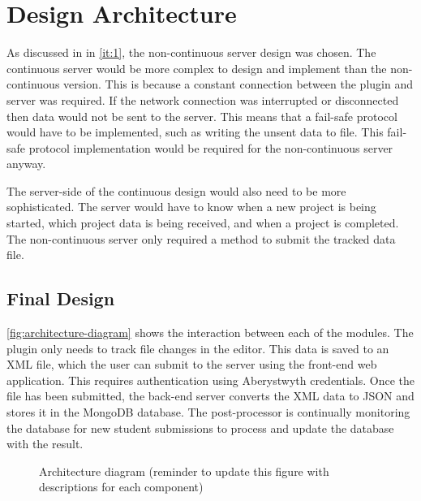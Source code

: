\chapter{Design Architecture}
\label{chp:design}
As discussed in  in \autoref{it:1}, the non-continuous server design was chosen. The continuous server would be more complex to design and implement than the non-continuous version. This is because a constant connection between the plugin and server was required. If the network connection was interrupted or disconnected then data would not be sent to the server. This means that a fail-safe protocol would have to be implemented, such as writing the unsent data to file. This fail-safe protocol implementation would be required for the non-continuous server anyway.

The server-side of the continuous design would also need to be more sophisticated. The server would have to know when a new project is being started, which project data is being received, and when a project is completed. The non-continuous server only required a method to submit the tracked data file.

\section{Final Design}
\autoref{fig:architecture-diagram} shows the interaction between each of the modules. The plugin only needs to track file changes in the editor. This data is saved to an XML file, which the user can submit to the server using the front-end web application. This requires authentication using Aberystwyth credentials. Once the file has been submitted, the back-end server converts the XML data to JSON and stores it in the MongoDB database. The post-processor is continually monitoring the database for new student submissions to process and update the database with the result.

\begin{figure}[H]
  \centering
  \caption[Final design architecture diagram]{Architecture diagram (reminder to update this figure with descriptions for each component)}
  \label{fig:architecture-diagram}
\end{figure}

